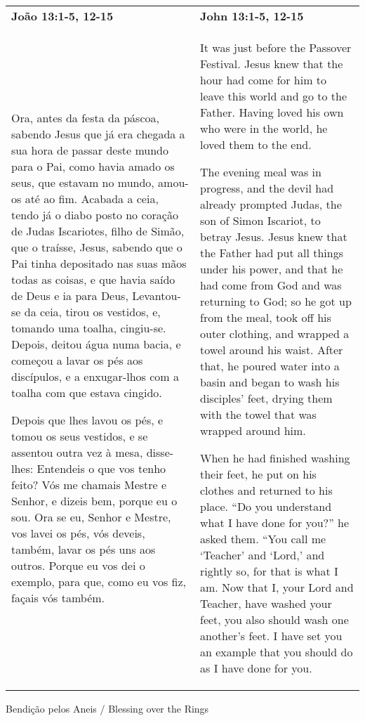 \begin{longtable}{p{2in}p{2in}}
  {\bf João 13:1-5, 12-15} & \hfill {\bf John 13:1-5, 12-15}\\
  Ora, antes da festa da páscoa, sabendo Jesus que já era chegada a sua hora de passar deste mundo para o Pai, como havia amado os seus, que estavam no mundo, amou-os até ao fim. Acabada a ceia, tendo já o diabo posto no coração de Judas Iscariotes, filho de Simão, que o traísse, Jesus, sabendo que o Pai tinha depositado nas suas mãos todas as coisas, e que havia saído de Deus e ia para Deus, Levantou-se da ceia, tirou os vestidos, e, tomando uma toalha, cingiu-se. Depois, deitou água numa bacia, e começou a lavar os pés aos discípulos, e a enxugar-lhos com a toalha com que estava cingido. 
  
  Depois que lhes lavou os pés, e tomou os seus vestidos, e se assentou outra vez à mesa, disse-lhes: Entendeis o que vos tenho feito? Vós me chamais Mestre e Senhor, e dizeis bem, porque eu o sou. Ora se eu, Senhor e Mestre, vos lavei os pés, vós deveis, também, lavar os pés uns aos outros. Porque eu vos dei o exemplo, para que, como eu vos fiz, façais vós também. 
  &  
It was just before the Passover Festival. Jesus knew that the hour had come for him to leave this world and go to the Father. Having loved his own who were in the world, he loved them to the end.

The evening meal was in progress, and the devil had already prompted Judas, the son of Simon Iscariot, to betray Jesus. Jesus knew that the Father had put all things under his power, and that he had come from God and was returning to God; so he got up from the meal, took off his outer clothing, and wrapped a towel around his waist. After that, he poured water into a basin and began to wash his disciples’ feet, drying them with the towel that was wrapped around him.

When he had finished washing their feet, he put on his clothes and returned to his place. “Do you understand what I have done for you?” he asked them. “You call me ‘Teacher’ and ‘Lord,’ and rightly so, for that is what I am.  Now that I, your Lord and Teacher, have washed your feet, you also should wash one another’s feet. I have set you an example that you should do as I have done for you.
\end{longtable}

\vspace{20pt}

{\large Bendição pelos Aneis / Blessing over the Rings}

